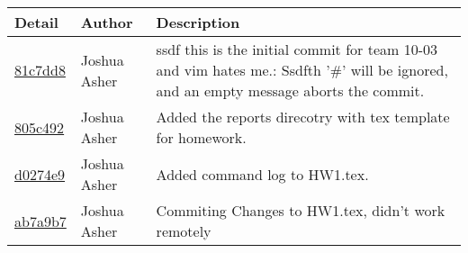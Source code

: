 \begin{tabular}{l l l}\textbf{Detail} & \textbf{Author} & \textbf{Description}\\\hline
\href{.//commit/81c7dd8fd8e6a88f6510a043e621dd6b01fc8e5c}{81c7dd8} & Joshua Asher & ssdf this is the initial commit for team 10-03 and vim hates me.: Ssdfth '#' will be ignored, and an empty message aborts the commit.\\\hline
\href{.//commit/805c492e98007c3a790adbf9a93510e3d1554b9e}{805c492} & Joshua Asher & Added the reports direcotry with tex template for homework.\\\hline
\href{.//commit/d0274e9f69f9eaf63240fb412118aa80ac17c95c}{d0274e9} & Joshua Asher & Added command log to HW1.tex.\\\hline
\href{.//commit/ab7a9b7f1f030f5833b1f23f416d8fab0e95cb72}{ab7a9b7} & Joshua Asher & Commiting Changes to HW1.tex, didn't work remotely\\\hline\end{tabular}
